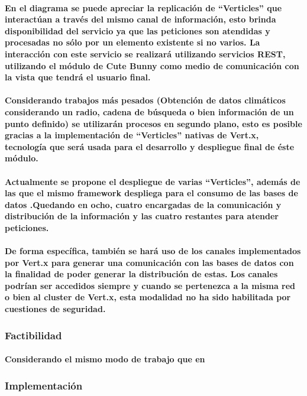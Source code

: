     \paragraph{En el diagrama se puede apreciar la replicación de ``Verticles'' que interactúan a través del mismo canal de información, esto brinda disponibilidad del servicio ya que las peticiones son atendidas y procesadas no sólo por un elemento existente si no varios. La interacción con este servicio se realizará utilizando servicios REST, utilizando el módulo de Cute Bunny como medio de comunicación con la vista que tendrá el usuario final.}
    \paragraph{Considerando trabajos más pesados (Obtención de datos climáticos considerando un radio, cadena de búsqueda o bien información de un punto definido) se utilizarán procesos en segundo plano, esto es posible gracias a la implementación de ``Verticles'' nativas de Vert.x, tecnología que será usada para el desarrollo y despliegue final de éste módulo.}
    \paragraph{Actualmente se propone el despliegue de varias ``Verticles'', además de las que el mismo framework despliega para el consumo de las bases de datos \cite{33}.Quedando en ocho, cuatro encargadas de la comunicación y distribución de la información y las cuatro restantes para atender peticiones.} 
    \paragraph{De forma específica, también se hará uso de los canales implementados por Vert.x para generar una comunicación con las bases de datos con la finalidad de poder generar la distribución de estas. Los canales podrían ser accedidos siempre y cuando se pertenezca a la misma red o bien al cluster de Vert.x, esta modalidad no ha sido habilitada por cuestiones de seguridad.}
  \subsubsection{Factibilidad} 
    \paragraph{Considerando el mismo modo de trabajo que en }
  \subsubsection{Implementación}
